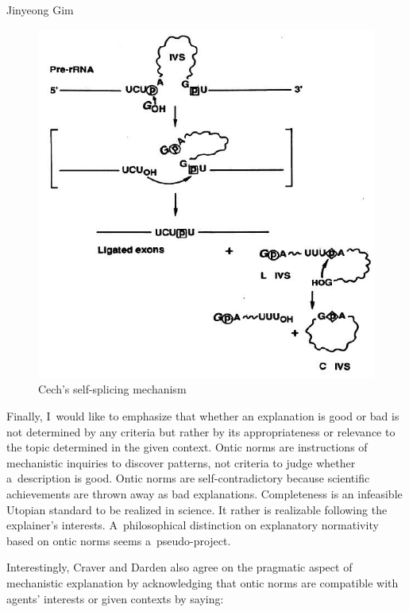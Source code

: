 \begin{artengenv}{Jinyeong Gim}
\begin{figure}[H]
 \begin{center}
 \includegraphics[width=.8\textwidth]{ART_Gim/fig.7300.jpg}%
 \end{center}%
 \caption{Cech's self-splicing mechanism
 \parencite[][p.582]{zaug_autocatalytic_1983}}\label{gim.fig7}
\end{figure}


Finally, I~would like to emphasize that whether an explanation is good or bad is not determined by any criteria but rather by its appropriateness or relevance to the topic determined in the given context. Ontic norms are instructions of mechanistic inquiries to discover patterns, not criteria to judge whether a~description is good. Ontic norms are self-contradictory because scientific achievements are thrown away as bad explanations. Completeness is an infeasible Utopian standard to be realized in science. It rather is realizable following the explainer's interests. A~philosophical distinction on explanatory normativity based on ontic norms seems a~pseudo-project.

Interestingly, Craver and Darden also agree on the pragmatic aspect of mechanistic explanation by acknowledging that ontic norms are compatible with agents' interests or given contexts by saying:


\end{artengenv}
